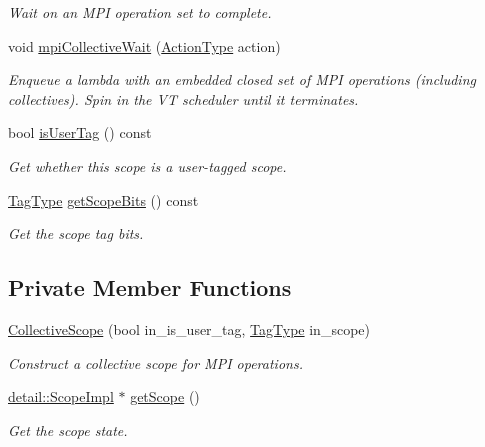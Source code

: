 \begin{DoxyCompactItemize}
\begin{DoxyCompactList}\small\item\em Wait on an M\+PI operation set to complete. \end{DoxyCompactList}\item 
void \hyperlink{structvt_1_1collective_1_1_collective_scope_a0ef41233afe63fc9ead8431e226af193}{mpi\+Collective\+Wait} (\hyperlink{namespacevt_ae0a5a7b18cc99d7b732cb4d44f46b0f3}{Action\+Type} action)
\begin{DoxyCompactList}\small\item\em Enqueue a lambda with an embedded closed set of M\+PI operations (including collectives). Spin in the VT scheduler until it terminates. \end{DoxyCompactList}\item 
bool \hyperlink{structvt_1_1collective_1_1_collective_scope_a8f8aa109ef27449f8fcb5eb378587196}{is\+User\+Tag} () const
\begin{DoxyCompactList}\small\item\em Get whether this scope is a user-\/tagged scope. \end{DoxyCompactList}\item 
\hyperlink{namespacevt_a84ab281dae04a52a4b243d6bf62d0e52}{Tag\+Type} \hyperlink{structvt_1_1collective_1_1_collective_scope_abed60df0901f32a362a908dccdcbe0fb}{get\+Scope\+Bits} () const
\begin{DoxyCompactList}\small\item\em Get the scope tag bits. \end{DoxyCompactList}\end{DoxyCompactItemize}
\subsection*{Private Member Functions}
\begin{DoxyCompactItemize}
\item 
\hyperlink{structvt_1_1collective_1_1_collective_scope_a2b51fd570c218fc089caaded29fd17c9}{Collective\+Scope} (bool in\+\_\+is\+\_\+user\+\_\+tag, \hyperlink{namespacevt_a84ab281dae04a52a4b243d6bf62d0e52}{Tag\+Type} in\+\_\+scope)
\begin{DoxyCompactList}\small\item\em Construct a collective scope for M\+PI operations. \end{DoxyCompactList}\item 
\hyperlink{structvt_1_1collective_1_1detail_1_1_scope_impl}{detail\+::\+Scope\+Impl} $\ast$ \hyperlink{structvt_1_1collective_1_1_collective_scope_a71b296b1ab86bf0814a4863327165f1c}{get\+Scope} ()
\begin{DoxyCompactList}\small\item\em Get the scope state. \end{DoxyCompactList}\end{DoxyCompactItemize}
